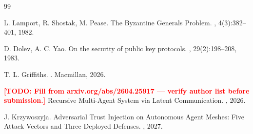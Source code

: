 \documentclass[letterpaper,twocolumn,10pt]{article}
\newcommand{\todo}[1]{\textcolor{red}{\textbf{[TODO: #1]}}}
\begin{document}
\begin{thebibliography}{99}

L. Lamport, R. Shostak, M. Pease.
\newblock The Byzantine Generals Problem.
, 4(3):382--401, 1982.

D. Dolev, A. C. Yao.
\newblock On the security of public key protocols.
, 29(2):198--208, 1983.

T. L. Griffiths.
.
\newblock Macmillan, 2026.

\todo{Fill from arxiv.org/abs/2604.25917 — verify author list before submission.}
\newblock Recursive Multi-Agent System via Latent Communication.
, 2026.

J. Krzywoszyja.
\newblock Adversarial Trust Injection on Autonomous Agent Meshes:
  Five Attack Vectors and Three Deployed Defenses.
, 2027.

\end{thebibliography}
\end{document}

